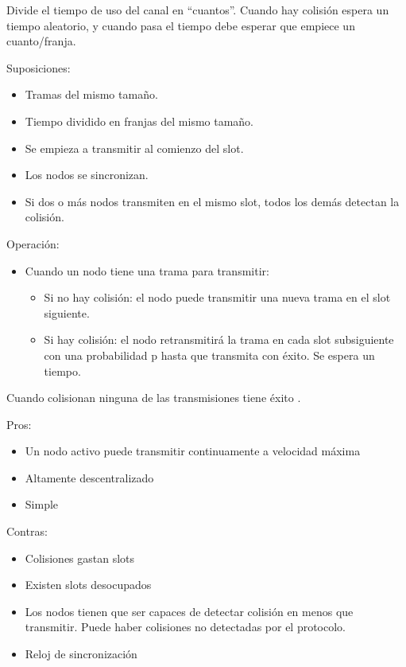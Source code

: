 \documentclass[12pt, twoside, openright]{report} %
\begin{document}
Divide el tiempo de uso del canal en ``cuantos''. Cuando hay
colisión espera un tiempo aleatorio, y cuando pasa el tiempo
debe esperar que empiece un cuanto/franja.

Suposiciones:

\begin{itemize}
	\item Tramas del mismo tamaño.
	\item Tiempo dividido en franjas del mismo tamaño.
	\item Se empieza a transmitir al comienzo del slot.
	\item Los nodos se sincronizan.
	\item Si dos o más nodos transmiten en el mismo slot, todos los
	      demás detectan la colisión.
\end{itemize}

Operación:

\begin{itemize}
	\item Cuando un nodo tiene una trama para transmitir:

	      \begin{itemize}
		      \item Si no hay colisión: el nodo puede transmitir una nueva
		            trama en el slot siguiente.
		      \item Si hay colisión: el nodo retransmitirá la trama en cada
		            slot subsiguiente con una probabilidad p hasta que
		            transmita con éxito. Se espera un tiempo.
	      \end{itemize}
\end{itemize}

Cuando colisionan ninguna de las transmisiones tiene éxito .

Pros:

\begin{itemize}
	\item Un nodo activo puede transmitir continuamente a velocidad
	      máxima
	\item Altamente descentralizado
	\item Simple
\end{itemize}

Contras:

\begin{itemize}
	\item Colisiones gastan slots
	\item Existen slots desocupados
	\item Los nodos tienen que ser capaces de detectar colisión en
	      menos que transmitir. Puede haber colisiones no detectadas
	      por el protocolo.
	\item Reloj de sincronización
\end{itemize}
\end{document}
